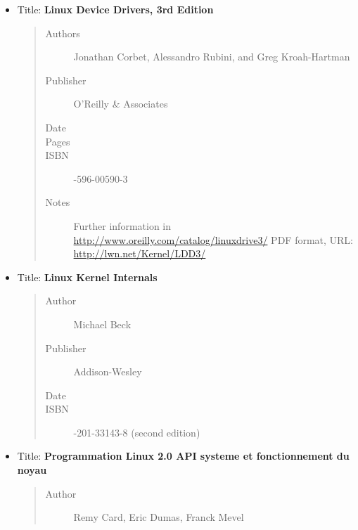 \documentclass[a4paper,8pt,english]{sphinxmanual}
\begin{document}
\label{process/kernel-docs:ldd3-published}\begin{itemize}
\item {} 
Title: \textbf{Linux Device Drivers, 3rd Edition}
\begin{quote}\begin{description}
\item[{Authors}] \leavevmode
Jonathan Corbet, Alessandro Rubini, and Greg Kroah-Hartman

\item[{Publisher}] \leavevmode
O'Reilly \& Associates

\item[{Date}] 

\item[{Pages}] 

\item[{ISBN}] -596-00590-3

\item[{Notes}] \leavevmode
Further information in
\href{http://www.oreilly.com/catalog/linuxdrive3/}{http://www.oreilly.com/catalog/linuxdrive3/}
PDF format, URL: \href{http://lwn.net/Kernel/LDD3/}{http://lwn.net/Kernel/LDD3/}

\end{description}\end{quote}

\item {} 
Title: \textbf{Linux Kernel Internals}
\begin{quote}\begin{description}
\item[{Author}] \leavevmode
Michael Beck

\item[{Publisher}] \leavevmode
Addison-Wesley

\item[{Date}] 

\item[{ISBN}] -201-33143-8 (second edition)

\end{description}\end{quote}

\item {} 
Title: \textbf{Programmation Linux 2.0 API systeme et fonctionnement du noyau}
\begin{quote}\begin{description}
\item[{Author}] \leavevmode
Remy Card, Eric Dumas, Franck Mevel


\end{description}
\end{quote}
\end{itemize}
\end{document}
